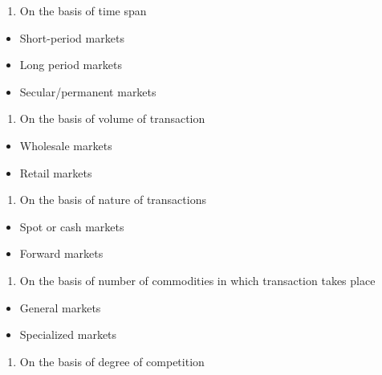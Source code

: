 \documentclass[11pt,]{book}
\providecommand{\tightlist}{%
  \setlength{\itemsep}{0pt}\setlength{\parskip}{0pt}}
\theoremstyle{definition}
\theoremstyle{definition}
\theoremstyle{definition}
\theoremstyle{remark}
\begin{document}
\begin{enumerate}
\def\labelenumi{\arabic{enumi}.}
\setcounter{enumi}{2}
\tightlist
\item
  On the basis of time span
\end{enumerate}

\begin{itemize}
\tightlist
\item
  Short-period markets
\item
  Long period markets
\item
  Secular/permanent markets
\end{itemize}

\begin{enumerate}
\def\labelenumi{\arabic{enumi}.}
\setcounter{enumi}{3}
\tightlist
\item
  On the basis of volume of transaction
\end{enumerate}

\begin{itemize}
\tightlist
\item
  Wholesale markets
\item
  Retail markets
\end{itemize}

\begin{enumerate}
\def\labelenumi{\arabic{enumi}.}
\setcounter{enumi}{4}
\tightlist
\item
  On the basis of nature of transactions
\end{enumerate}

\begin{itemize}
\tightlist
\item
  Spot or cash markets
\item
  Forward markets
\end{itemize}

\begin{enumerate}
\def\labelenumi{\arabic{enumi}.}
\setcounter{enumi}{5}
\tightlist
\item
  On the basis of number of commodities in which transaction takes place
\end{enumerate}

\begin{itemize}
\tightlist
\item
  General markets
\item
  Specialized markets
\end{itemize}

\begin{enumerate}
\def\labelenumi{\arabic{enumi}.}
\setcounter{enumi}{6}
\tightlist
\item
  On the basis of degree of competition
\end{enumerate}
\end{document}
